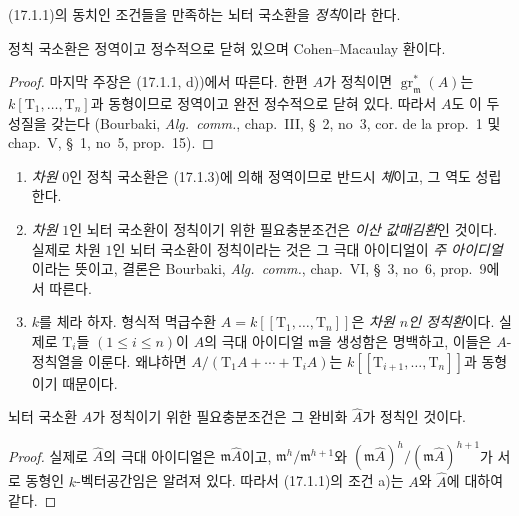 \begin{definition}[17.1.2]
\label{0.17.1.2-fr}
(17.1.1)의 동치인 조건들을 만족하는 뇌터 국소환을 \emph{정칙}이라
한다.
\end{definition}

\begin{corollary}[17.1.3]
\label{0.17.1.3-fr}
정칙 국소환은 정역이고 정수적으로 닫혀 있으며 Cohen--Macaulay
환이다.
\end{corollary}

\begin{proof}
마지막 주장은 (17.1.1, d))에서 따른다. 한편 $A$가 정칙이면
$\operatorname{gr}^*_{\mathfrak{m}}(A)$는
$k[\mathrm{T}_1,\ldots,\mathrm{T}_n]$과 동형이므로 정역이고 완전
정수적으로 닫혀 있다. 따라서 $A$도 이 두 성질을 갖는다 (Bourbaki,
\emph{Alg.~comm.}, chap.~III, \S~2, no~3, cor. de la prop.~1 및 chap.~V,
\S~1, no~5, prop.~15).
\end{proof}

\begin{examples}[17.1.4]
\label{0.17.1.4-fr}
\begin{enumerate}
  \item[\rm (i)] \emph{차원} $0$인 정칙 국소환은 (17.1.3)에 의해
  정역이므로 반드시 \emph{체}이고, 그 역도 성립한다.
  \item[\rm (ii)] \emph{차원} $1$인 뇌터 국소환이 정칙이기 위한
  필요충분조건은 \emph{이산 값매김환}인 것이다. 실제로 차원 $1$인
  뇌터 국소환이 정칙이라는 것은 그 극대 아이디얼이 \emph{주
  아이디얼}이라는 뜻이고, 결론은 Bourbaki, \emph{Alg.~comm.},
  chap.~VI, \S~3, no~6, prop.~9에서 따른다.
  \item[\rm (iii)] $k$를 체라 하자. 형식적 멱급수환
  $A=k[[\mathrm{T}_1,\ldots,\mathrm{T}_n]]$은 \emph{차원 $n$인
  정칙환}이다. 실제로 $\mathrm{T}_i$들 $(1\leq i\leq n)$이 $A$의
  극대 아이디얼 $\mathfrak{m}$을 생성함은 명백하고, 이들은
  $A$-정칙열을 이룬다. 왜냐하면
  $A/(\mathrm{T}_1A+\cdots+\mathrm{T}_iA)$는
  $k[[\mathrm{T}_{i+1},\ldots,\mathrm{T}_n]]$과 동형이기 때문이다.
\end{enumerate}
\end{examples}

\begin{proposition}[17.1.5]
\label{0.17.1.5-fr}
뇌터 국소환 $A$가 정칙이기 위한 필요충분조건은 그 완비화
$\widehat{A}$가 정칙인 것이다.
\end{proposition}

\begin{proof}
실제로 $\widehat{A}$의 극대 아이디얼은
$\mathfrak{m}\widehat{A}$이고,
$\mathfrak{m}^h/\mathfrak{m}^{h+1}$와
$(\mathfrak{m}\widehat{A})^h/(\mathfrak{m}\widehat{A})^{h+1}$가 서로
동형인 $k$-벡터공간임은 알려져 있다. 따라서 (17.1.1)의 조건 a)는
$A$와 $\widehat{A}$에 대하여 같다.
\end{proof}

